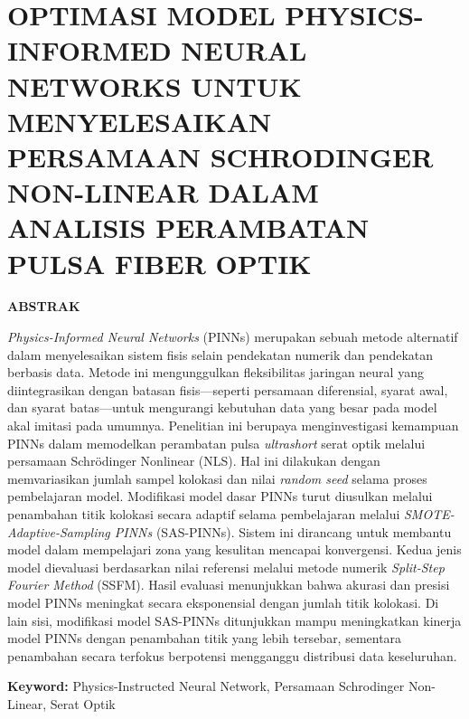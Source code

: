 \chapter*{OPTIMASI MODEL PHYSICS-INFORMED NEURAL NETWORKS UNTUK MENYELESAIKAN PERSAMAAN SCHRODINGER NON-LINEAR DALAM ANALISIS PERAMBATAN PULSA FIBER OPTIK}

\begin{center}
	\vspace{0.5cm}
	\textbf{ABSTRAK}
\end{center}
\emph{Physics-Informed Neural Networks} (PINNs) merupakan sebuah metode alternatif dalam menyelesaikan sistem fisis selain pendekatan numerik dan pendekatan berbasis data. Metode ini mengunggulkan fleksibilitas jaringan neural yang diintegrasikan dengan batasan fisis---seperti persamaan diferensial, syarat awal, dan syarat batas---untuk mengurangi kebutuhan data yang besar pada model akal imitasi pada umumnya. Penelitian ini berupaya menginvestigasi kemampuan PINNs dalam memodelkan perambatan pulsa \emph{ultrashort} serat optik melalui persamaan Schr\"{o}dinger Nonlinear (NLS). Hal ini dilakukan dengan memvariasikan jumlah sampel kolokasi dan nilai \emph{random seed} selama proses pembelajaran model. Modifikasi  model dasar PINNs turut diusulkan melalui penambahan titik kolokasi secara adaptif selama pembelajaran melalui \emph{SMOTE-Adaptive-Sampling PINNs} (SAS-PINNs). Sistem ini dirancang untuk membantu model dalam mempelajari zona yang kesulitan mencapai konvergensi. Kedua jenis model dievaluasi berdasarkan nilai referensi melalui metode numerik \emph{Split-Step Fourier Method} (SSFM). Hasil evaluasi menunjukkan bahwa akurasi dan presisi model PINNs meningkat secara eksponensial dengan jumlah titik kolokasi. Di lain sisi, modifikasi model SAS-PINNs ditunjukkan mampu meningkatkan kinerja model PINNs dengan penambahan titik yang lebih tersebar, sementara penambahan secara terfokus berpotensi mengganggu distribusi data keseluruhan.

\noindent\textbf{Keyword:} Physics-Instructed Neural Network, Persamaan Schrodinger Non-Linear, Serat Optik
\cleardoublepage

